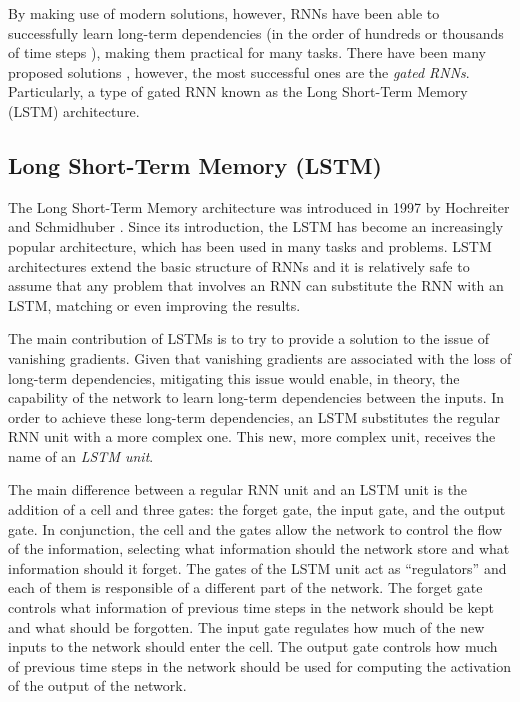 By making use of modern solutions, however, RNNs have been able to successfully learn long-term dependencies (in the order of hundreds or thousands of time steps \cite{hochreiter_long_1997}), making them practical for many tasks. There have been many proposed solutions \cite{el_hihi_hierarchical_1995, yildiz_re-visiting_2012, jaeger_long_2012}, however, the most successful ones are the \emph{gated RNNs}. Particularly, a type of gated RNN known as the Long Short-Term Memory (LSTM) architecture.

\subsection{Long Short-Term Memory (LSTM)}

The Long Short-Term Memory architecture was introduced in 1997 by Hochreiter and Schmidhuber \cite{hochreiter_long_1997}. Since its introduction, the LSTM has become an increasingly popular architecture, which has been used in many tasks and problems. LSTM architectures extend the basic structure of RNNs and it is relatively safe to assume that any problem that involves an RNN can substitute the RNN with an LSTM, matching or even improving the results.

The main contribution of LSTMs is to try to provide a solution to the issue of vanishing gradients. Given that vanishing gradients are associated with the loss of long-term dependencies, mitigating this issue would enable, in theory, the capability of the network to learn long-term dependencies between the inputs. In order to achieve these long-term dependencies, an LSTM substitutes the regular RNN unit with a more complex one. This new, more complex unit, receives the name of an \emph{LSTM unit}.

The main difference between a regular RNN unit and an LSTM unit is the addition of a cell and three gates: the forget gate, the input gate, and the output gate. In conjunction, the cell and the gates allow the network to control the flow of the information, selecting what information should the network store and what information should it forget. 
The gates of the LSTM unit act as ``regulators'' and each of them is responsible of a different part of the network. The forget gate controls what information of previous time steps in the network should be kept and what should be forgotten. The input gate regulates how much of the new inputs to the network should enter the cell. The output gate controls how much of previous time steps in the network should be used for computing the activation of the output of the network.

